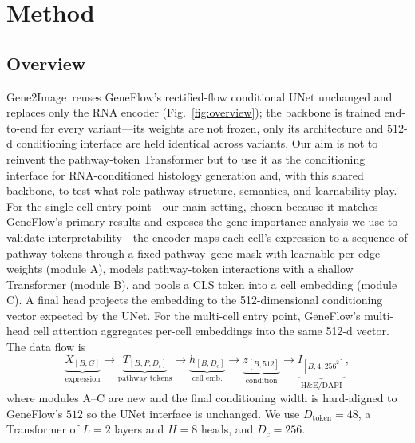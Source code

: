 \documentclass[journal]{IEEEtran}
\newcommand{\method}{Gene2Image}
\begin{document}
\section{Method}
\label{sec:method}

\subsection{Overview}
\method\ reuses GeneFlow's rectified-flow conditional UNet unchanged and replaces only
the RNA encoder (Fig.~\ref{fig:overview}); the backbone is trained end-to-end for every
variant---its weights are not frozen, only its architecture and $512$-d conditioning
interface are held identical across variants. Our aim is not to reinvent the
pathway-token Transformer but to use it as the conditioning interface for
RNA-conditioned histology generation and, with this shared backbone, to test what
role pathway structure, semantics, and learnability play. For the single-cell entry point---our
main setting, chosen because it matches GeneFlow's primary results and exposes the
gene-importance analysis we use to validate interpretability---the encoder maps each
cell's expression to a sequence of pathway tokens through a fixed pathway--gene
mask with learnable per-edge weights (module A), models pathway-token interactions with
a shallow Transformer (module B), and pools a CLS token into a cell embedding
(module C). A final head projects the embedding to the 512-dimensional
conditioning vector expected by the UNet. For the multi-cell entry point,
GeneFlow's multi-head cell attention aggregates per-cell embeddings into the same
512-d vector. The data flow is
\begin{equation*}
\underbrace{X_{[B,G]}}_{\text{expression}} \!\rightarrow\!
\underbrace{T_{[B,P,D_t]}}_{\text{pathway tokens}} \!\rightarrow\!
\underbrace{h_{[B,D_c]}}_{\text{cell emb.}} \!\rightarrow\!
\underbrace{z_{[B,512]}}_{\text{condition}} \!\rightarrow\!
\underbrace{I_{[B,4,256^2]}}_{\text{H\&E/DAPI}} ,
\end{equation*}
where modules A--C are new and the final conditioning width is hard-aligned to
GeneFlow's $512$ so the UNet interface is unchanged. We use $D_{\text{token}}=48$,
a Transformer of $L{=}2$ layers and $H{=}8$ heads, and $D_c{=}256$.
\end{document}

